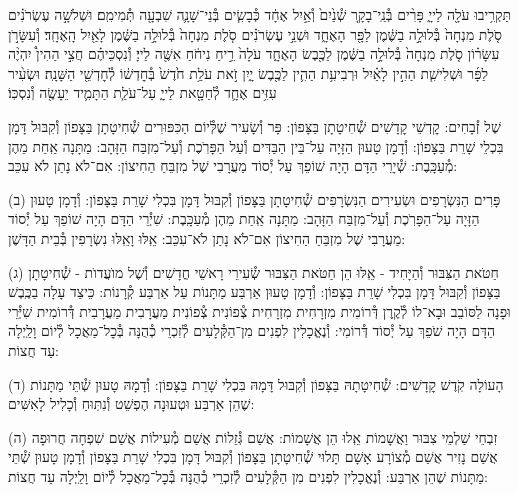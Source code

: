 \documentclass[twoside, openany, parskip=half, 11pt]{book}
\begin{document}
תַּקְרִ֥יבוּ עֹלָ֖ה לַייָ֑ פָּרִ֨ים בְּ֯נֵֽי־בָקָ֤ר שְׁ֯נַ֙יִם֙ וְ֯אַ֣יִל אֶחָ֔ד כְּ֯בָשִׂ֧ים בְּ֯נֵי־שָׁנָ֛ה שִׁבְעָ֖ה תְּ֯מִימִֽם׃
וּשְׁלֹשָׁ֣ה עֶשְׂרֹנִ֗ים סֹ֤לֶת מִנְחָה֙ בְּ֯לוּלָ֣ה בַשֶּׁ֔מֶן לַפָּ֖ר הָאֶחָ֑ד וּשְׁנֵ֣י עֶשְׂרֹנִ֗ים סֹ֤לֶת מִנְחָה֙ בְּ֯לוּלָ֣ה בַשֶּׁ֔מֶן לָאַ֖יִל הָֽאֶחָֽד׃
וְ֯עִשָּׂרֹ֣ן עִשָּׂר֗וֹן סֹ֤לֶת מִנְחָה֙ בְּ֯לוּלָ֣ה בַשֶּׁ֔מֶן לַכֶּ֖בֶשׂ הָאֶחָ֑ד עֹלָה֙ רֵ֣יחַ נִיחֹ֔חַ אִשֶּׁ֖ה לַייָ׃
וְ֯נִסְכֵּיהֶ֗ם חֲצִ֣י הַהִין֩ יִהְיֶ֨ה לַפָּ֜ר וּשְׁלִישִׁ֧ת הַהִ֣ין לָאַ֗יִל וּרְבִיעִ֥ת הַהִ֛ין לַכֶּ֖בֶשׂ יָ֑יִן זֹ֣את עֹלַ֥ת חֹ֙דֶשׁ֙ בְּ֯חׇדְשׁ֔וֹ לְ֯חׇדְשֵׁ֖י הַשָּׁנָֽה׃
וּשְׂעִ֨יר עִזִּ֥ים אֶחָ֛ד לְ֯חַטָּ֖את לַייָ֑ עַל־עֹלַ֧ת הַתָּמִ֛יד יֵעָשֶׂ֖ה וְ֯נִסְכּֽוֹ׃

%
שֶׁל זְ֯בָחִים: קׇדְשֵׁי קׇדָשִׁים שְׁ֯חִיטָתָן בַּצָּפוֹן: פָּר וְ֯שָׂעִיר שֶׁלְּ֯יוֹם הַכִּפּוּרִים שְׁ֯חִיטָתָן בַּצָּפוֹן וְ֯קִבּוּל דָּמָן בִּכְלֵי שָׁרֵת בַּצָּפוֹן: וְ֯דָמָן טָעוּן הַזָּיָה עַל־בֵּין הַבַּדִּים וְ֯עַל הַפָּרֹֽכֶת וְ֯עַל־מִזְבַּח הַזָּהָב: מַתָּנָה אַֽחַת מֵהֶן מְ֯עַכָּֽבֶת: שְׁ֯יָרֵי הַדָּם הָיָה שׁוֹפֵךְ עַל יְ֯סוֹד מַעֲרָבִי שֶׁל מִזְבֵּחַ הַחִיצוֹן: אִם־לֹא נָתַן לֹא עִכֵּב:

(ב) פָּרִים הַנִּשְׂרָפִים וּשְׂעִירִים הַנִּשְׂרָפִים שְׁ֯חִיטָתָן בַּצָּפוֹן וְ֯קִבּוּל דָּמָן בִּכְלִי שָׁרֵת בַּצָּפוֹן: וְ֯דָמָן טָעוּן הַזָּיָה עַל־הַפָּרֹֽכֶת וְ֯עַל־מִזְבַּח הַזָּהָב: מַתָּנָה אַֽחַת מֵהֶן מְ֯עַכָּֽבֶת: שִׁיְ֯רֵי הַדָּם הָיָה שׁוֹפֵךְ עַל יְ֯סוֹד מַעֲרָבִי שֶׁל מִזְבֵּחַ הַחִיצוֹן אִם־לֹא נָתַן לֹא־עִכֵּב: אֵֽלּוּ וָאֵֽלּוּ נִשְׂרָפִין בְּ֯בֵית הַדָּשֶׁן:

(ג) חַטֹּאת הַצִּבּוּר וְ֯הַיָּחִיד - אֵֽלּוּ הֵן חַטֹּאת הַצִּבּוּר שְׂ֯עִירֵי רָאשֵׁי חֳדָשִׁים וְ֯שֶׁל מוׁעֲדוׂת - שְׁ֯חִיטָתָן בַּצָּפוֹן וְ֯קִבּוּל דָּמָן בִּכְלִי שָׁרֵת בַּצָּפוֹן: וְ֯דָמָן טָעוּן אַרְבַּע מַתָּנוֹת עַל אַרְבַּע קְ֯רָנוֹת: כֵּיצַד עָלָה בַכֶּֽבֶשׁ וּפָנָה לַסּוֹבֵב וּבָא־לוֹ לְ֯קֶֽרֶן דְּ֯רוֹמִית מִזְרָחִית מִזְרָחִית צְ֯פוֹנִית צְ֯פוֹנִית מַעֲרָבִית מַעֲרָבִית דְּ֯רוֹמִית שִׁיְּ֯רֵי הַדָּם הָיָה שֹׁפֵךְ עַל יְ֯סוֹד דְּ֯רוֹמִי: וְ֯נֶאֱכָלִין לִפְנִים מִן־הַקְּ֯לָעִים לְ֯זִכְרֵי כְ֯הֻנָּה בְּ֯כׇל־מַאֲכָל לְ֯יוֹם וָלַֽיְלָה עַד חֲצוֹת:

(ד) הָעוֹלָה קֹֽדֶשׁ קׇדָשִׁים: שְׁ֯חִיטָתָהּ בַּצָּפוֹן וְ֯קִבּוּל דָּמָהּ בִּכְלִי שָׁרֵת בַּצָּפוֹן: וְ֯דָמָהּ טָעוּן שְׁ֯תֵּי מַתָּנוֹת שֶׁהֵן אַרְבַּע וּטְעוּנָה הֶפְשֵׁט וְ֯נִתּֽוּחַ וְ֯כָלִיל לָאִשִּׁים:

(ה) זִבְחֵי שַׁלְמֵי צִבּוּר וַאֲשָׁמוֹת אֵֽלוּ הֵן אֲשָׁמוֹת: אֲשַׁם גְּ֯זֵלוֹת אֲשַׁם מְ֯עִילוֹת אֲשַׁם שִׁפְחָה חֲרוּפָה אֲשַׁם נָזִיר אֲשַׁם מְ֯צוֹרָע אָשָׁם תָּלוּי שְׁ֯חִיטָתָן בַּצָּפוֹן וְ֯קִבּוּל דָּמָן בִּכְלִי שָׁרֵת בַּצָּפוֹן וְ֯דָמָן טָעוּן שְׁ֯תֵּי מַתָּנוֹת שֶׁהֵן אַרְבַּע: וְ֯נֶאֱכָלִין לִפְנִים מִן הַקְּ֯לָעִים לְ֯זִכְרֵי כְ֯הֻנָּה בְּ֯כׇל־מַאֲכָל לְ֯יוֹם וָלַֽיְלָה עַד חֲצוֹת:
\end{document}

